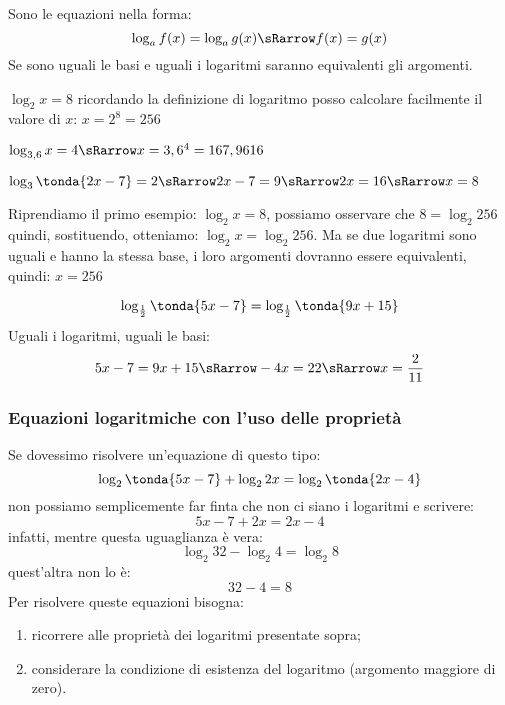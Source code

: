 Sono le equazioni nella forma:
\[\log_a{f(x)} = \log_a{g(x)} \sRarrow f(x) = g(x)\]
Se sono uguali le basi e uguali i logaritmi saranno equivalenti gli argomenti.

\begin{esempio}
 \(\log_2{x} = 8\) ricordando la definizione di logaritmo posso calcolare 
facilmente il valore di \(x\): \(x = 2^8 = 256\)
\end{esempio}

\begin{esempio}
 \(\log_{3,6}{x} = 4 \sRarrow x = 3,6^4 = 167,9616\)
\end{esempio}

\begin{esempio}
 \(\log_{3}\tonda{2x-7} = 2 \sRarrow 2x -7 = 9 \sRarrow 2x = 16 \sRarrow x = 8\)
\end{esempio}

\begin{esempio}
 Riprendiamo il primo esempio: \(\log_2{x} = 8\), possiamo osservare che 
 \(8 = \log_2{256}\) quindi, sostituendo, 
 otteniamo: \(\log_2{x} = \log_2{256}\). Ma se due logaritmi sono uguali e 
hanno la stessa base, i loro argomenti dovranno essere equivalenti, quindi:
\(x = 256\)
\end{esempio}
\begin{esempio}
 \[\log_{\frac{1}{2}}\tonda{5x -7} = \log_{\frac{1}{2}}\tonda{9x +15}\]
 Uguali i logaritmi, uguali le basi:
 \[5x -7 = 9x +15 \sRarrow -4x = 22 \sRarrow x = \frac{2}{11}\]
\end{esempio}

\subsubsection{Equazioni logaritmiche con l'uso delle proprietà}
\label{subsubsec:esplog_eq_log_proprieta}

Se dovessimo risolvere un'equazione di questo tipo:
\[\log_2\tonda{5x -7} + \log_2{2x}= \log_2\tonda{2x -4}\]
non possiamo semplicemente far finta che non ci siano i logaritmi e scrivere:
\[5x -7 + 2x = 2x -4\]
infatti, mentre questa uguaglianza è vera:
\[\log_2 32 -\log_2 4 = \log_2 8\]
quest'altra non lo è:
\[32 -4 = 8\]
Per risolvere queste equazioni bisogna:
\begin{enumerate}
 \item ricorrere alle proprietà dei logaritmi presentate sopra;
 \item considerare la condizione di esistenza del logaritmo 
 (argomento maggiore di zero).
\end{enumerate}


